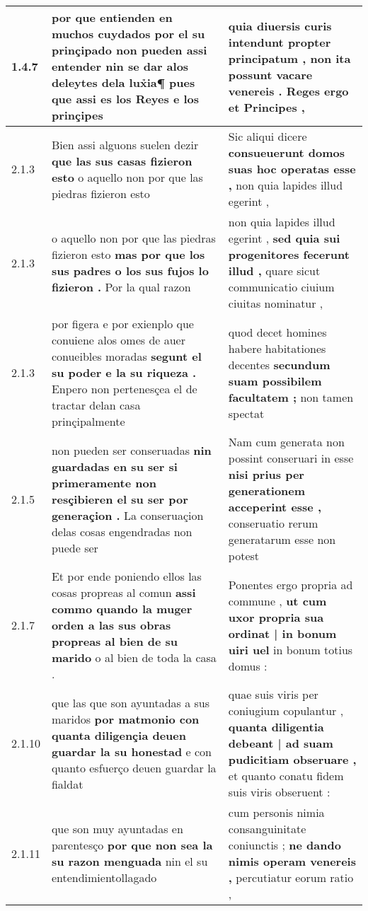 \begin{tabular}{|p{1cm}|p{6.5cm}|p{6.5cm}|}
1.4.7 & por que entienden en muchos cuydados \textbf{ por el su prinçipado non pueden assi entender nin se dar alos deleytes dela lux̉ia¶ } pues que assi es los Reyes e los prinçipes & quia diuersis curis intendunt propter principatum , \textbf{ non ita possunt vacare venereis . } Reges ergo et Principes , \\\hline
2.1.3 & Bien assi alguons suelen dezir \textbf{ que las sus casas fizieron esto } o aquello non por que las piedras fizieron esto & Sic aliqui dicere \textbf{ consueuerunt domos suas hoc operatas esse , } non quia lapides illud egerint , \\\hline
2.1.3 & o aquello non por que las piedras fizieron esto \textbf{ mas por que los sus padres o los sus fujos lo fizieron . } Por la qual razon & non quia lapides illud egerint , \textbf{ sed quia sui progenitores fecerunt illud , } quare sicut communicatio ciuium ciuitas nominatur , \\\hline
2.1.3 & por figera e por exienplo que conuiene alos omes de auer conueibles moradas \textbf{ segunt el su poder e la su riqueza . } Enpero non pertenesçea el de tractar delan casa prinçipalmente & quod decet homines habere habitationes decentes \textbf{ secundum suam possibilem facultatem ; } non tamen spectat \\\hline
2.1.5 & non pueden ser conseruadas \textbf{ nin guardadas en su ser si primeramente non resçibieren el su ser por generaçion . } La conseruaçion delas cosas engendradas non puede ser & Nam cum generata non possint conseruari in esse \textbf{ nisi prius per generationem acceperint esse , } conseruatio rerum generatarum esse non potest \\\hline
2.1.7 & Et por ende poniendo ellos las cosas propreas al comun \textbf{ assi commo quando la muger orden a las sus obras propreas al bien de su marido } o al bien de toda la casa . & Ponentes ergo propria ad commune , \textbf{ ut cum uxor propria sua ordinat | in bonum uiri uel } in bonum totius domus : \\\hline
2.1.10 & que las que son ayuntadas a sus maridos \textbf{ por matmonio con quanta diligençia deuen guardar la su honestad } e con quanto esfuerço deuen guardar la fialdat & quae suis viris per coniugium copulantur , \textbf{ quanta diligentia debeant | ad suam pudicitiam obseruare , } et quanto conatu fidem suis viris obseruent : \\\hline
2.1.11 & que son muy ayuntadas en parentesço \textbf{ por que non sea la su razon menguada } nin el su entendimientollagado & cum personis nimia consanguinitate coniunctis ; \textbf{ ne dando nimis operam venereis , } percutiatur eorum ratio , \\\hline

\end{tabular}
